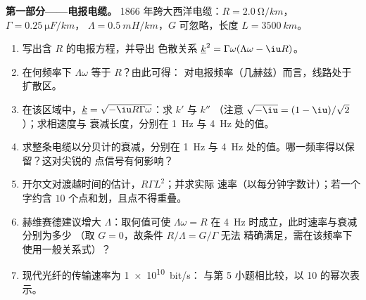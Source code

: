 \begin{problem}
\label{pb:b2:dispersion-wave-packets:1}

\medskip
\noindent\textbf{第一部分——电报电缆。}
1866 年跨大西洋电缆：$R = \qty{2.0}{\ohm/km}$，$\Gamma = \qty{0.25}{\micro F/km}$，
$\Lambda = \qty{0.5}{mH/km}$，$G$ 可忽略，长度 $L = \qty{3500}{km}$。
\begin{enumerate}
  \item 写出含 $R$ 的电报方程，并导出
        色散关系 $\underline k^2 = \Gamma\omega(\Lambda\omega - \iu R)$。
  \item 在何频率下 $\Lambda\omega$ 等于 $R$？由此可得：
        对电报频率（几赫兹）而言，线路处于
        扩散区。
  \item 在该区域中，$\underline k = \sqrt{-\iu R\Gamma\omega}$：求 $k'$ 与 $k''$
        （注意 $\sqrt{-\iu} = (1 - \iu)/\sqrt2$）；求相速度与
        衰减长度，分别在 \qty{1}{Hz} 与 \qty{4}{Hz} 处的值。
  \item 求整条电缆以分贝计的衰减，分别在 \qty{1}{Hz} 与
        \qty{4}{Hz} 处的值。哪一频率得以保留？这对尖锐的
        点信号有何影响？
  \item 开尔文对渡越时间的估计，$R\Gamma L^2$；并求实际
        速率（以每分钟字数计）；若一个字约含
        $10$ 个点和划，且点不得重叠。
  \item 赫维赛德建议增大 $\Lambda$：取何值可使 $\Lambda\omega = R$
        在 \qty{4}{Hz} 时成立，此时速率与衰减分别为多少
        （取 $G = 0$，故条件 $R/\Lambda = G/\Gamma$ 无法
        精确满足，需在该频率下使用一般关系式）？
  \item 现代光纤的传输速率为 \qty{1e10}{bit/s}：
        与第 5 小题相比较，以 10 的幂次表示。
\end{enumerate}


\end{problem}
